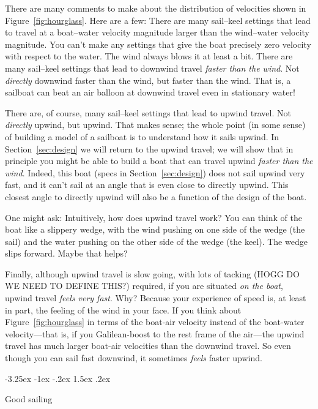 \documentclass[letterpaper]{article}
\makeatletter
\newcommand{\secref}[1]{Section~\ref{#1}}
\newcommand{\figref}[1]{Figure~\ref{#1}}
\renewcommand\section{\@startsection {section}{1}{\z@}%
  {-3.25ex \@plus -1ex \@minus -.2ex}%
  {1.5ex \@plus .2ex}%
  {\raggedright\normalfont\large\bfseries}}
\makeatother
\begin{document}
There are many comments to make about the distribution of velocities shown in \figref{fig:hourglass}.
Here are a few:
There are many sail--keel settings that lead to travel at a boat--water velocity magnitude larger than the wind--water velocity magnitude.
You can't make any settings that give the boat precisely zero velocity with respect to the water.
The wind always blows it at least a bit.
There are many sail--keel settings that lead to downwind travel \emph{faster than the wind}.
Not \emph{directly} downwind faster than the wind, but faster than the wind.
That is, a sailboat can beat an air balloon at downwind travel even in stationary water!

There are, of course, many sail--keel settings that lead to upwind travel.
Not \emph{directly} upwind, but upwind.
That makes sense; the whole point (in some sense) of building a model of a sailboat is to understand how it sails upwind.
In \secref{sec:design} we will return to the upwind travel; we will show that in principle you might be able to build a boat that can travel upwind \emph{faster than the wind}.
Indeed, this boat (specs in \secref{sec:design}) does not sail upwind very fast, and it can't sail at an angle that is even close to directly upwind.
This closest angle to directly upwind will also be a function of the design of the boat.

One might ask: Intuitively, how does upwind travel work?
You can think of the boat like a slippery wedge, with the wind pushing on one side of the wedge (the sail) and the water pushing on the other side of the wedge (the keel).
The wedge slips forward.
Maybe that helps?

Finally, although upwind travel is slow going, with lots of tacking (HOGG DO WE NEED TO DEFINE THIS?) required, if you are situated \emph{on the boat}, upwind travel \emph{feels very fast}.
Why?
Because your experience of speed is, at least in part, the feeling of the wind in your face.
If you think about \figref{fig:hourglass} in terms of the boat-air velocity instead of the boat-water velocity---that is, if you Galilean-boost to the rest frame of the air---the upwind travel has much larger boat-air velocities than the downwind travel.
So even though you can sail fast downwind, it sometimes \emph{feels} faster upwind.

\section{Good sailing}\label{sec:good}
\end{document}
